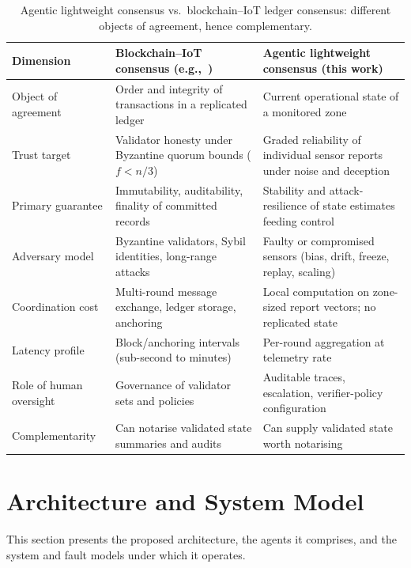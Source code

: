 \documentclass[preprint,11pt]{elsarticle}
\begin{document}
\begin{table}[!tbp]
\centering
\caption{Agentic lightweight consensus vs.\ blockchain--IoT ledger
consensus: different objects of agreement, hence complementary.}
\label{tab:positioning}
\footnotesize
\begin{tabular}{p{}p{}p{}}
\toprule
\textbf{Dimension} & \textbf{Blockchain--IoT consensus
(e.g.,~\cite{ramachandran2026,haque2024})} & \textbf{Agentic lightweight
consensus (this work)} \\
\midrule
Object of agreement & Order and integrity of transactions in a
replicated ledger & Current operational state of a monitored zone \\
Trust target & Validator honesty under Byzantine quorum bounds
($f<n/3$)~\cite{castro1999} & Graded reliability of individual sensor
reports under noise and deception \\
Primary guarantee & Immutability, auditability, finality of committed
records & Stability and attack-resilience of state estimates feeding
control \\
Adversary model & Byzantine validators, Sybil identities, long-range
attacks & Faulty or compromised sensors (bias, drift, freeze, replay,
scaling) \\
Coordination cost & Multi-round message exchange, ledger storage,
anchoring & Local computation on zone-sized report vectors; no
replicated state \\
Latency profile & Block/anchoring intervals (sub-second to minutes) &
Per-round aggregation at telemetry rate \\
Role of human oversight & Governance of validator sets and policies &
Auditable traces, escalation, verifier-policy configuration \\
Complementarity & Can notarise validated state summaries and audits &
Can supply validated state worth notarising \\
\bottomrule
\end{tabular}
\end{table}

\section{Architecture and System Model}
\label{sec:architecture}

This section presents the proposed architecture, the agents it
comprises, and the system and fault models under which it operates.
\end{document}

